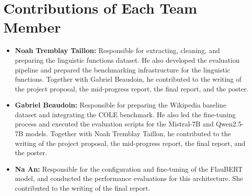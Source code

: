\documentclass[11pt]{article}
\begin{document}
\section{Contributions of Each Team Member}
\begin{itemize}
    \item \textbf{Noah Tremblay Taillon:} Responsible for extracting, cleaning, and preparing the linguistic functions dataset. He also developed the evaluation pipeline and prepared the benchmarking infrastructure for the linguistic functions. Together with Gabriel Beaudoin, he contributed to the writing of the project proposal, the mid-progress report, the final report, and the poster.
    \item \textbf{Gabriel Beaudoin:} Responsible for preparing the Wikipedia baseline dataset and integrating the COLE benchmark. He also led the fine-tuning process and executed the evaluation scripts for the Mistral-7B and Qwen2.5-7B models. Together with Noah Tremblay Taillon, he contributed to the writing of the project proposal, the mid-progress report, the final report, and the poster.
    \item \textbf{Na An:} Responsible for the configuration and fine-tuning of the FlauBERT model, and conducted the performance evaluations for this architecture. She contributed to the writing of the final report.
\end{itemize}
\end{document}
